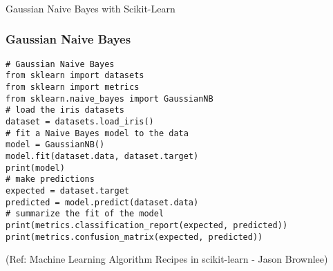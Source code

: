 \begin{frame}[fragile]\frametitle{}
\begin{center}
{\Large Gaussian Naive Bayes with Scikit-Learn}
\end{center}
\end{frame}


\begin{frame}[fragile]\frametitle{Gaussian Naive Bayes}
\begin{lstlisting}
# Gaussian Naive Bayes
from sklearn import datasets
from sklearn import metrics
from sklearn.naive_bayes import GaussianNB
# load the iris datasets
dataset = datasets.load_iris()
# fit a Naive Bayes model to the data
model = GaussianNB()
model.fit(dataset.data, dataset.target)
print(model)
# make predictions
expected = dataset.target
predicted = model.predict(dataset.data)
# summarize the fit of the model
print(metrics.classification_report(expected, predicted))
print(metrics.confusion_matrix(expected, predicted))
\end{lstlisting}

{\tiny (Ref: Machine Learning Algorithm Recipes in scikit-learn - Jason Brownlee)}

\end{frame}








